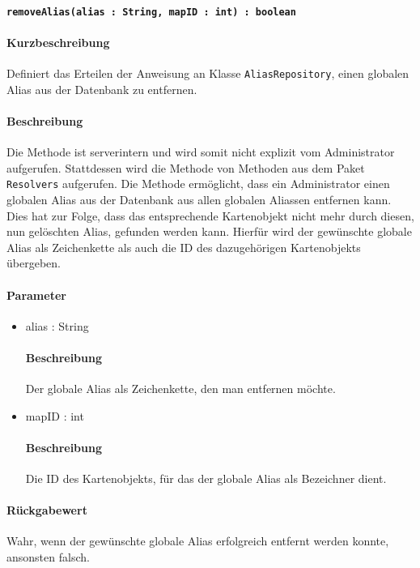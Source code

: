 \paragraph{\texttt{removeAlias(alias : String, mapID : int) : boolean}}%
\paragraph*{Kurzbeschreibung}
Definiert das Erteilen der Anweisung an Klasse \texttt{AliasRepository}, einen globalen Alias aus der Datenbank zu entfernen.
\paragraph*{Beschreibung}
Die Methode ist serverintern und wird somit nicht explizit vom Administrator aufgerufen.
Stattdessen wird die Methode von Methoden aus dem Paket \texttt{Resolvers} aufgerufen.
Die Methode ermöglicht, dass ein Administrator einen globalen Alias aus der Datenbank aus allen globalen Aliassen entfernen kann.
Dies hat zur Folge, dass das entsprechende Kartenobjekt nicht mehr durch diesen, nun gelöschten Alias, gefunden werden kann.
Hierfür wird der gewünschte globale Alias als Zeichenkette als auch die ID des dazugehörigen Kartenobjekts übergeben.
\paragraph*{Parameter}
\begin{itemize}
    \item alias : String
    		\paragraph*{Beschreibung}
    		Der globale Alias als Zeichenkette, den man entfernen möchte.
    \item mapID : int
    		\paragraph*{Beschreibung}
    		Die ID des Kartenobjekts, für das der globale Alias als Bezeichner dient.
\end{itemize}
\paragraph*{Rückgabewert}
Wahr, wenn der gewünschte globale Alias erfolgreich entfernt werden konnte, ansonsten falsch.
